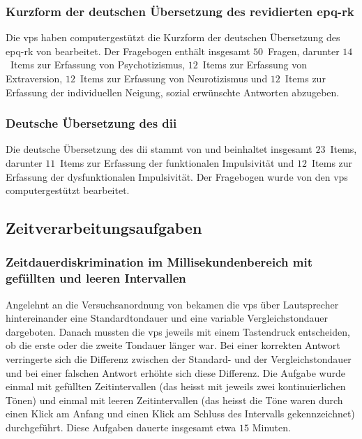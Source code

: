 \documentclass[11pt, twoside, a4paper]{book}		%
\begin{document}
\subsubsection*{Kurzform der deutschen Übersetzung des revidierten \gls{epq-rk}}
Die \glspl{vp} haben  computergestützt die Kurzform der deutschen Übersetzung des \gls{epq-rk} von \citet{Ruch1999} bearbeitet. Der Fragebogen enthält insgesamt $50$~Fragen, darunter $14$~Items zur Erfassung von Psychotizismus, $12$~Items zur Erfassung von Extraversion, $12$~Items zur Erfassung von Neurotizismus und $12$~Items zur Erfassung der individuellen Neigung, sozial erwünschte Antworten abzugeben.

\subsubsection*{Deutsche Übersetzung des \gls{dii}}
Die deutsche Übersetzung des \gls{dii} stammt von \citet{Kuhmann1996} und beinhaltet insgesamt $23$~Items, darunter $11$~Items zur Erfassung der funktionalen Impulsivität und  $12$~Items zur Erfassung der dysfunktionalen Impulsivität. Der Fragebogen wurde von den \glspl{vp} computergestützt bearbeitet.



\subsection{Zeitverarbeitungsaufgaben}

\subsubsection*{Zeitdauerdiskrimination im Millisekundenbereich mit gefüllten und leeren Intervallen}

Angelehnt an die Versuchsanordnung von \citet{Stauffer2011} bekamen die \glspl{vp} über Lautsprecher hintereinander eine Standardtondauer und eine variable Vergleichstondauer dargeboten. Danach mussten die \glspl{vp} jeweils mit einem Tastendruck entscheiden, ob die erste oder die zweite Tondauer länger war. Bei einer korrekten Antwort verringerte sich die Differenz zwischen der Standard- und der Vergleichstondauer und bei einer falschen Antwort erhöhte sich diese Differenz. Die Aufgabe wurde einmal mit gefüllten Zeitintervallen (das heisst mit jeweils zwei kontinuierlichen Tönen) und einmal mit leeren Zeitintervallen (das heisst die Töne waren durch einen Klick am Anfang und einen Klick am Schluss des Intervalls gekennzeichnet) durchgeführt. Diese Aufgaben dauerte insgesamt etwa $15$ Minuten.
\end{document}
